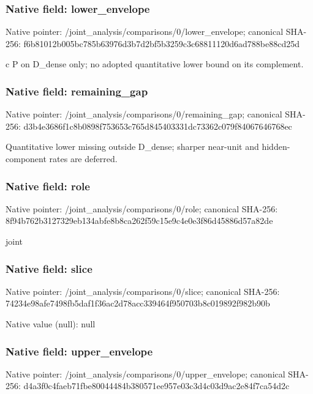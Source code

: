 \documentclass[10pt,a4paper]{article}
\begin{document}
\subsubsection{Native field: lower\_\allowbreak{}envelope}
Native pointer: /joint\_\allowbreak{}analysis/comparisons/0/lower\_\allowbreak{}envelope; canonical SHA-256: f6b81012b005bc785b63976d3b7d2bf5b3259c3c68811120d6ad788be88cd25d

\begingroup\raggedright\sloppy c P on D\_\allowbreak{}dense only;\allowbreak{} no adopted quantitative lower bound on its complement.\par\endgroup

\subsubsection{Native field: remaining\_\allowbreak{}gap}
Native pointer: /joint\_\allowbreak{}analysis/comparisons/0/remaining\_\allowbreak{}gap; canonical SHA-256: d3b4e3686f1c8b0898f753653c765d845403331dc73362c079f84067646768ec

\begingroup\raggedright\sloppy Quantitative lower missing outside D\_\allowbreak{}dense;\allowbreak{} sharper near-unit and hidden-component rates are deferred.\par\endgroup

\subsubsection{Native field: role}
Native pointer: /joint\_\allowbreak{}analysis/comparisons/0/role; canonical SHA-256: 8f94b762b3127329eb134abfe8b8ca262f59c15e9c4e0e3f86d45886d57a82de

\begingroup\raggedright\sloppy joint\par\endgroup

\subsubsection{Native field: slice}
Native pointer: /joint\_\allowbreak{}analysis/comparisons/0/slice; canonical SHA-256: 74234e98afe7498fb5daf1f36ac2d78acc339464f950703b8c019892f982b90b

Native value (null): null

\subsubsection{Native field: upper\_\allowbreak{}envelope}
Native pointer: /joint\_\allowbreak{}analysis/comparisons/0/upper\_\allowbreak{}envelope; canonical SHA-256: d4a3f0c4faeb71fbe80044484b380571ee957e03c3d4c03d9ac2e84f7ca54d2c
\end{document}
